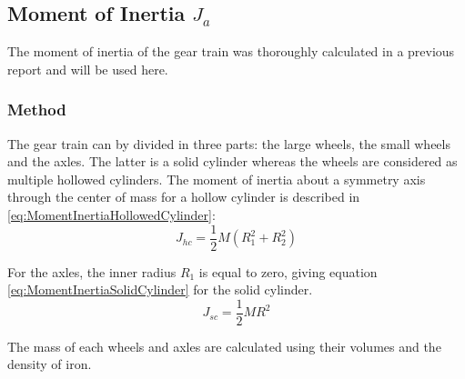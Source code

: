 \subsection{Moment of Inertia $J_a$}
The moment of inertia of the gear train was thoroughly calculated in a previous report and will be used here.

\subsubsection*{Method}
The gear train can by divided in three parts: the large wheels, the small wheels and the axles. The latter is a solid cylinder whereas the wheels are considered as multiple hollowed cylinders. The moment of inertia about a symmetry axis through the center of mass for a hollow cylinder is described in \autoref{eq:MomentInertiaHollowedCylinder}: 
\begin{equation}
	J_{hc} = \frac{1}{2} M (R_1^2 + R_2^2)
	\label{eq:MomentInertiaHollowedCylinder}
\end{equation}
\startexplain
{}
\stopexplain

For the axles, the inner radius $R_1$ is equal to zero, giving equation \autoref{eq:MomentInertiaSolidCylinder} for the solid cylinder.
\begin{equation}
	J_{sc} = \frac{1}{2} M R^2
	\label{eq:MomentInertiaSolidCylinder}
\end{equation}
\startexplain
{}
\stopexplain

The mass of each wheels and axles are calculated using their volumes and the density of iron.

